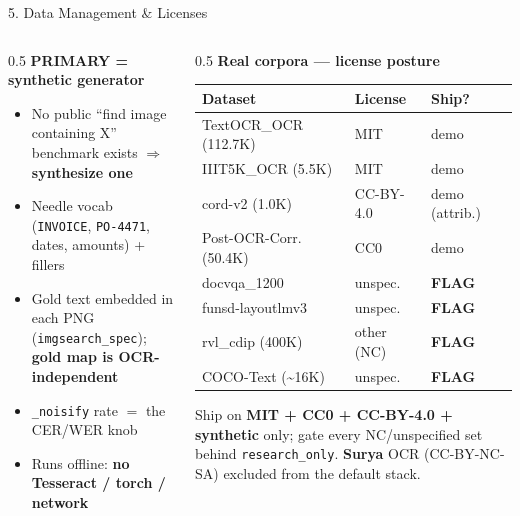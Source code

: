 \documentclass[10pt,aspectratio=169]{beamer}
\begin{document}
\begin{frame}{5. Data Management \& Licenses}
\begin{columns}[T]
\begin{column}{0.5\textwidth}
\textbf{PRIMARY = synthetic generator}
\begin{itemize}\scriptsize
  \item No public ``find image containing X'' benchmark exists $\Rightarrow$ \textbf{synthesize one}
  \item Needle vocab (\texttt{INVOICE}, \texttt{PO-4471}, dates, amounts) + fillers
  \item Gold text embedded in each PNG (\texttt{imgsearch\_spec}); \textbf{gold map is OCR-independent}
  \item \texttt{\_noisify} rate $=$ the CER/WER knob
  \item Runs offline: \textbf{no Tesseract / torch / network}
\end{itemize}
\end{column}
\begin{column}{0.5\textwidth}
\textbf{Real corpora --- license posture}
\begin{table}[h]
\centering\scriptsize
\begin{tabular}{lll}
\toprule
\textbf{Dataset} & \textbf{License} & \textbf{Ship?} \\
\midrule
TextOCR\_OCR (112.7K) & MIT & demo \\
IIIT5K\_OCR (5.5K) & MIT & demo \\
cord-v2 (1.0K) & CC-BY-4.0 & demo (attrib.) \\
Post-OCR-Corr. (50.4K) & CC0 & demo \\
\midrule
docvqa\_1200 & unspec. & \textbf{FLAG} \\
funsd-layoutlmv3 & unspec. & \textbf{FLAG} \\
rvl\_cdip (400K) & other (NC) & \textbf{FLAG} \\
COCO-Text (\textasciitilde16K) & unspec. & \textbf{FLAG} \\
\bottomrule
\end{tabular}
\end{table}
\scriptsize Ship on \textbf{MIT + CC0 + CC-BY-4.0 + synthetic} only; gate every NC/unspecified set behind \texttt{research\_only}. \textbf{Surya} OCR (CC-BY-NC-SA) excluded from the default stack.
\end{column}
\end{columns}
\end{frame}
\end{document}
